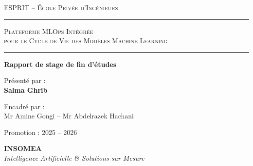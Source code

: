 \documentclass[a4paper, 12pt, openright]{report}
\begin{document}
\begin{titlepage}
\centering
\vspace*{1cm}

{\Large\textsc{ESPRIT -- École Privée d'Ingénieurs}}

\vspace{1cm}

\rule{\textwidth}{1.5pt}

\vspace{0.5cm}

{\fontsize{24}{28}\selectfont
\textsc{Plateforme MLOps Intégrée}\\[0.3cm]
\textsc{pour le Cycle de Vie des Modèles Machine Learning}
}

\vspace{0.5cm}

\rule{\textwidth}{1.5pt}

\vspace{2cm}

{\large\textbf{Rapport de stage de fin d'études}}

\vspace{1cm}

{\large Présenté par :}\\[0.3cm]
{\Large\textbf{Salma Ghrib}}

\vspace{1.5cm}

{\large Encadré par :}\\[0.3cm]
{\large Mr Amine Gongi \quad -- \quad Mr Abdelrazek Hachani}

\vspace{1.5cm}

{\large Promotion : 2025 -- 2026}

\vfill

{\normalsize\textbf{INSOMEA}\\[0.2cm]
\textit{Intelligence Artificielle \& Solutions sur Mesure}}

\end{titlepage}


% 

% 
\end{document}
